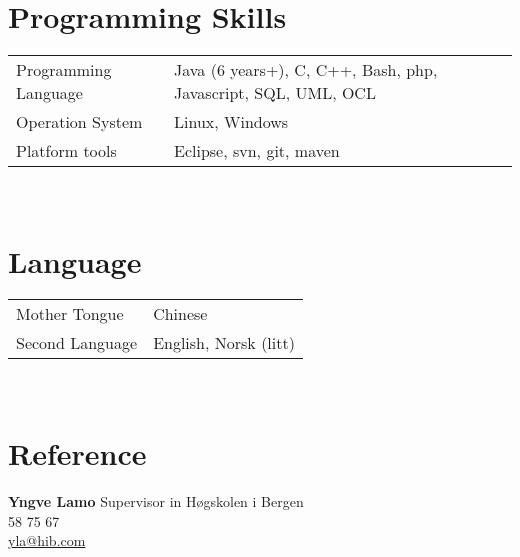 \documentclass[10pt]{article} %
\begin{document}
{\begin{minipage}[t]{0.44\textwidth}
\begin{tabular}{rl}
    \end{tabular}\\[10pt]
    
    
    \section{Programming Skills} 
    
    \begin{tabular}{R{85pt}L{140pt}}
        Programming Language
        & Java (6 years+), C, C++, Bash, php, Javascript, SQL, UML, OCL\\[1ex]
        Operation System
        & Linux, Windows\\[1ex]
        Platform tools & Eclipse, svn, git, maven
    \end{tabular}\\
    
    \section{Language}
    
    \begin{tabular}{R{80pt}L{160pt}}
        Mother Tongue & Chinese\\[1ex]
        Second Language & English, Norsk (litt) %
    \end{tabular}\\
    \section{Reference}
    \textbf{Yngve Lamo}   Supervisor in H\o gskolen i Bergen\\
    \Mobilefone {} 58 75 67\\
    \Letter \quad \href{mailto:yla@hib.com}{yla@hib.com}
    
    
\end{minipage} %
\quad
\begin{minipage}[t]{0.5\textwidth} %
\vspace{0pt} %
	

\end{minipage}}
\end{document}
